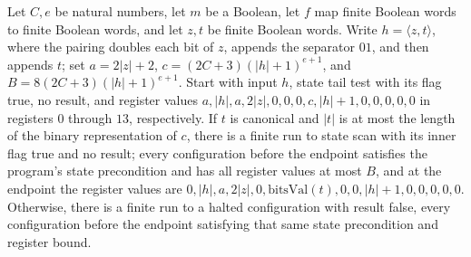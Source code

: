 \begin{lemma}
\label{Complexity.comp_outer_decode}
\leanok
{}
Let $C,e$ be natural numbers, let $m$ be a Boolean, let $f$ map finite Boolean words to
finite Boolean words, and let $z,t$ be finite Boolean words. Write $h=\langle z,t\rangle$, where the
pairing doubles each bit of $z$, appends the separator $01$, and then appends $t$; set
$a=2|z|+2$, $c=(2C+3)(|h|+1)^{e+1}$, and $B=8(2C+3)(|h|+1)^{e+1}$. Start with input $h$,
state tail test with its flag true, no result, and register values
$a,|h|,a,2|z|,0,0,0,c,|h|+1,0,0,0,0,0$ in registers $0$ through $13$, respectively. If
$t$ is canonical and $|t|$ is at most the length of the binary representation of $c$,
there is a finite run to state scan with its inner flag true and no result; every
configuration before the endpoint satisfies the program's state precondition and has all
register values at most $B$, and at the endpoint the register values are
$0,|h|,a,2|z|,0,\mathrm{bitsVal}(t),0,0,|h|+1,0,0,0,0,0$. Otherwise, there is a finite
run to a halted configuration with result false, every configuration before the endpoint
satisfying that same state precondition and register bound.
\end{lemma}

